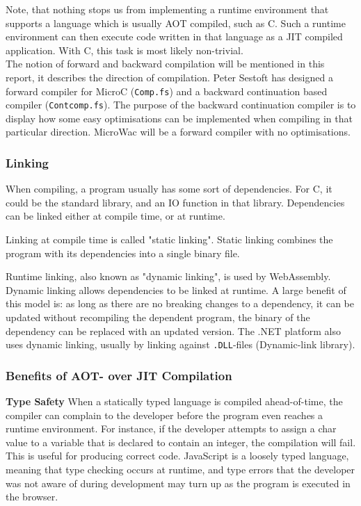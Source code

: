 \documentclass[a4paper]{article}
\begin{document}
Note, that nothing stops us from implementing a runtime environment that supports a language which is usually AOT compiled, such as C. Such a runtime environment can then execute code written in that language as a JIT compiled application. With C, this task is most likely non-trivial.\\

The notion of forward and backward compilation will be mentioned in this report, it describes the direction of compilation. Peter Sestoft has designed a forward compiler for MicroC (\texttt{Comp.fs}) and a backward continuation based compiler (\texttt{Contcomp.fs}). The purpose of the backward continuation compiler is to display how some easy optimisations can be implemented when compiling in that particular direction. MicroWac will be a forward compiler with no optimisations.

\subsubsection{Linking}
\label{sec:problem-analysis:compilers:linking}
When compiling, a program usually has some sort of dependencies. For C, it could be the standard library, and an IO function in that library. Dependencies can be linked either at compile time, or at runtime.

Linking at compile time is called "static linking". Static linking combines the program with its dependencies into a single binary file.

Runtime linking, also known as "dynamic linking", is used by WebAssembly. Dynamic linking allows dependencies to be linked at runtime. A large benefit of this model is: as long as there are no breaking changes to a dependency, it can be updated without recompiling the dependent program, the binary of the dependency can be replaced with an updated version. The .NET platform also uses dynamic linking, usually by linking against \texttt{.DLL}-files (Dynamic-link library).

\subsubsection{Benefits of AOT- over JIT Compilation}
\label{sec:problem-analysis:compilers:benefits-of-aot}
\textbf{Type Safety} When a statically typed language is compiled ahead-of-time, the compiler can complain to the developer before the program even reaches a runtime environment. For instance, if the developer attempts to assign a char value to a variable that is declared to contain an integer, the compilation will fail. This is useful for producing correct code. JavaScript is a loosely typed language, meaning that type checking occurs at runtime, and type errors that the developer was not aware of during development may turn up as the program is executed in the browser.\\
\end{document}
